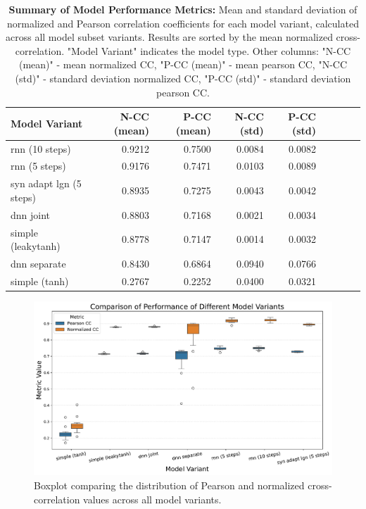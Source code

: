 \begin{table}
    \centering\footnotesize\sf
    \begin{tabular}{lrrrrrrrr}
        \toprule
        Model Variant & N-CC (mean) & P-CC (mean) & N-CC (std) & P-CC (std) \\
        \midrule
        rnn (10 steps) & 0.9212 & 0.7500 & 0.0084 & 0.0082 \\
        rnn (5 steps) & 0.9176 & 0.7471 & 0.0103 & 0.0089 \\
        syn adapt lgn (5 steps) & 0.8935 & 0.7275 & 0.0043 & 0.0042 \\
        dnn joint & 0.8803 & 0.7168 & 0.0021 & 0.0034 \\
        simple (leakytanh) & 0.8778 & 0.7147 & 0.0014 & 0.0032 \\
        dnn separate & 0.8430 & 0.6864 & 0.0940 & 0.0766 \\
        simple (tanh) & 0.2767 & 0.2252 & 0.0400 & 0.0321 \\
        \bottomrule
    \end{tabular}
        
    \caption{\textbf{Summary of Model Performance Metrics:} Mean and standard deviation of normalized and Pearson correlation coefficients for each model variant, calculated across all model subset variants. Results are sorted by the mean normalized cross-correlation. "Model Variant" indicates the model type. Other columns: "N-CC (mean)" - mean normalized CC, "P-CC (mean)" - mean pearson CC, "N-CC (std)" - standard deviation normalized CC, "P-CC (std)" - standard deviation pearson CC.}
    \label{tab:model_evaluation_overview_comparison}
\end{table}

\begin{figure}
    \centering
    \includegraphics[width=\linewidth]{img/plots/model_types_correlation_comparison.pdf}
    \caption{Boxplot comparing the distribution of Pearson and normalized cross-correlation values across all model variants.}
    \label{fig:model_types_correlation_comparison}
\end{figure}

